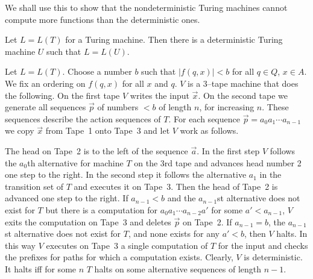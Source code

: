 We shall use this to show that the nondeterministic Turing
machines cannot compute more functions than the deterministic
ones.
\begin{prop}
Let $L = L(T)$ for a Turing machine. Then there is a
deterministic Turing machine $U$ such that
$L = L(U)$.
\end{prop}
\proofbeg
Let $L = L(T)$. Choose a number $b$ such that $|f(q,x)| < b$ for 
all $q \in Q$, $x \in A$. We fix an ordering on $f(q,x)$ for all 
$x$ and $q$. $V$ is a 3--tape machine that does the following. On the 
first tape $V$ writes the input $\vec{x}$. On the second tape we 
generate all sequences $\vec{p}$ of numbers $< b$ of length $n$, 
for increasing $n$. These sequences describe the action sequences 
of $T$. For each sequence $\vec{p} = a_0 a_1 \dotsb a_{n-1}$ we 
copy $\vec{x}$ from Tape~1 onto Tape~3 and let $V$ work as follows. 

The head on Tape~2 is to the left of the sequence $\vec{a}$. In the 
first step $V$ follows the $a_0$th alternative for machine $T$ on 
the 3rd tape and advances head number 2 one step to the right. In the 
second step it follows the alternative $a_1$ in the transition set of 
$T$ and executes it on Tape~3. Then the head of Tape~2 is advanced
one step to the right. If $a_{n-1} < b$ and the $a_{n-1}$st alternative 
does not exist for $T$ but there is a computation for 
$a_0a_1 \dotsb a_{n-2}a'$ for some $a' < a_{n-1}$, $V$ exits the 
computation on Tape~3 and deletes $\vec{p}$ on Tape~2. If $a_{n-1} = b$, 
the $a_{n-1}$st alternative does not exist for $T$, and none exists 
for any $a' < b$, then $V$ halts. In this way $V$ executes on Tape~3 
a single computation of $T$ for the input and checks the prefixes 
for paths for which a computation exists. 
Clearly, $V$ is deterministic. It halts iff for some $n$ $T$ halts 
on some alternative sequences of length $n-1$. 
\proofend

